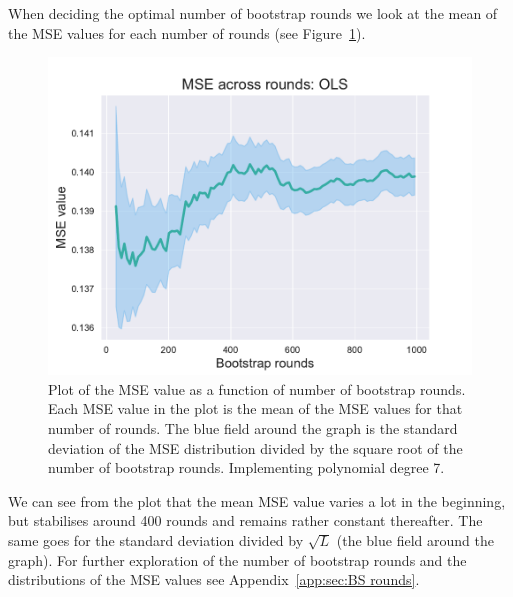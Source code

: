 \documentclass[twocolumn,english,notitlepage]{article}
\begin{document}
            When deciding the optimal number of bootstrap rounds we look at the mean of the MSE values for each number of rounds (see Figure~\ref{res:fig:bs_mse_across_rounds}). 
            \begin{figure}[ht]
                \centering
                \includegraphics[width=.9\linewidth]{BS_mse_across_rounds_OLS.pdf}
                \caption{Plot of the MSE value as a function of number of bootstrap rounds. Each MSE value in the plot is the mean of the MSE values for that number of rounds. The blue field around the graph is the standard deviation of the MSE distribution divided by the square root of the number of bootstrap rounds. Implementing polynomial degree 7.}
                \label{res:fig:bs_mse_across_rounds}
            \end{figure}
            We can see from the plot that the mean MSE value varies a lot in the beginning, but stabilises around 400 rounds and remains rather constant thereafter. The same goes for the standard deviation divided by $\sqrt{L}$ (the blue field around the graph). For further exploration of the number of bootstrap rounds and the distributions of the MSE values see Appendix~\ref{app:sec:BS rounds}. 
\end{document}
